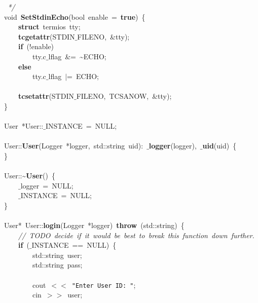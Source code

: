 \mbox{}\textit{\ */} \\
\mbox{}void\ \textbf{SetStdinEcho}(bool\ enable\ =\ \textbf{true})\ \{ \\
\mbox{}\ \ \ \ \textbf{struct}\ termios\ tty; \\
\mbox{}\ \ \ \ \textbf{tcgetattr}(STDIN$\_$FILENO,\ \&tty); \\
\mbox{}\ \ \ \ \textbf{if}\ (!enable) \\
\mbox{}\ \ \ \ \ \ \ \ tty.c$\_$lflag\ \&=\ \textasciitilde{}ECHO; \\
\mbox{}\ \ \ \ \textbf{else} \\
\mbox{}\ \ \ \ \ \ \ \ tty.c$\_$lflag\ $|$=\ ECHO; \\
\mbox{} \\
\mbox{}\ \ \ \ \textbf{tcsetattr}(STDIN$\_$FILENO,\ TCSANOW,\ \&tty); \\
\mbox{}\} \\
\mbox{} \\
\mbox{}User\ *User::$\_$INSTANCE\ =\ NULL; \\
\mbox{} \\
\mbox{}User::\textbf{User}(Logger\ *logger,\ std::string\ uid):\ \textbf{$\_$logger}(logger),\ \textbf{$\_$uid}(uid)\ \{ \\
\mbox{}\} \\
\mbox{} \\
\mbox{}User::\textasciitilde{}\textbf{User}()\ \{ \\
\mbox{}\ \ \ \ $\_$logger\ =\ NULL; \\
\mbox{}\ \ \ \ $\_$INSTANCE\ =\ NULL; \\
\mbox{}\} \\
\mbox{} \\
\mbox{}User*\ User::\textbf{login}(Logger\ *logger)\ \textbf{throw}\ (std::string)\ \{ \\
\mbox{}\ \ \ \ \textit{//\ TODO\ decide\ if\ it\ would\ be\ best\ to\ break\ this\ function\ down\ further.} \\
\mbox{}\ \ \ \ \textbf{if}\ ($\_$INSTANCE\ ==\ NULL)\ \{ \\
\mbox{}\ \ \ \ \ \ \ \ std::string\ user; \\
\mbox{}\ \ \ \ \ \ \ \ std::string\ pass; \\
\mbox{} \\
\mbox{}\ \ \ \ \ \ \ \ cout\ $<$$<$\ \texttt{"{}Enter\ User\ ID:\ "{}}; \\
\mbox{}\ \ \ \ \ \ \ \ cin\ $>$$>$\ user; \\
\mbox{} \\
